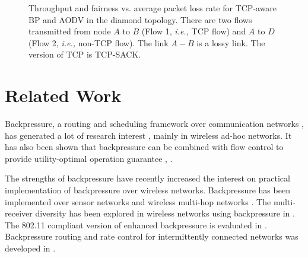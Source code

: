\documentclass[conference]{IEEEtran}
\newcommand{\ie}{{\em i.e., }}
\begin{document}
\begin{figure}[t!]
\vspace{-0pt}
\begin{center}
\end{center}
\begin{center}
\vspace{-5pt}
\caption{\label{fig:diamond_thrpt_vs_loss_sack_UDP_TCP} \scriptsize Throughput and fairness vs. average packet loss rate for TCP-aware BP and AODV in the diamond topology. There are two flows transmitted from node $A$ to $B$ (Flow 1, \ie TCP flow) and $A$ to $D$ (Flow 2, \ie non-TCP flow). The link $A-B$ is a lossy link. The version of TCP is TCP-SACK.
}
\end{center}
\vspace{-25pt}
\end{figure}






\section{Related Work}\label{sec:related}
Backpressure, a routing and scheduling framework over communication networks \cite{tass_eph1}, \cite{tass_eph2} has generated a lot of research interest \cite{neely_book}, mainly in wireless ad-hoc networks. It has also been shown that backpressure can be combined with flow control to provide utility-optimal operation guarantee \cite{neely_mod}, \cite{stolyar_greedy}.

The strengths of backpressure have recently increased the interest on practical implementation of backpressure over wireless networks. Backpressure has been implemented over sensor networks \cite{routing_wtht_routes} and wireless multi-hop networks \cite{xpress}. The multi-receiver diversity has been explored in wireless networks using backpressure in \cite{javidi_diversity}. The 802.11 compliant version of enhanced backpressure is evaluated in \cite{choumas}. Backpressure routing and rate control for intermittently connected networks was developed in \cite{backpressure_for_icns}. 
\end{document}
